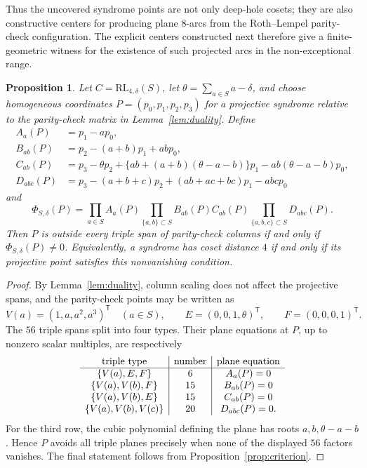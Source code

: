 ﻿\documentclass[11pt]{article}
\newcommand{\RL}{\mathrm{RL}}
\theoremstyle{plain}
\newtheorem{proposition}[theorem]{Proposition}
\theoremstyle{definition}
\begin{document}
Thus the uncovered syndrome points are not only deep-hole cosets; they are
also constructive centers for producing plane \(8\)-arcs from the
Roth--Lempel parity-check configuration.  The explicit centers constructed
next therefore give a finite-geometric witness for the existence of such
projected arcs in the non-exceptional range.

\begin{proposition}
\label{prop:explicit-product}
Let \(C=\RL_{4,\delta}(S)\), let
\(\theta=\sum_{a\in S}a-\delta\), and choose homogeneous coordinates
\(P=(p_0,p_1,p_2,p_3)\) for a projective syndrome relative to the
parity-check matrix in Lemma~\ref{lem:duality}.  Define
\[
\begin{aligned}
A_a(P)&=p_1-ap_0,\\
B_{ab}(P)&=p_2-(a+b)p_1+abp_0,\\
C_{ab}(P)&=p_3-\theta p_2+
 \{ab+(a+b)(\theta-a-b)\}p_1-ab(\theta-a-b)p_0,\\
D_{abc}(P)&=p_3-(a+b+c)p_2+(ab+ac+bc)p_1-abcp_0
\end{aligned}
\]
and
\[
 \Phi_{S,\delta}(P)=
 \prod_{a\in S}A_a(P)
 \prod_{\{a,b\}\subset S}B_{ab}(P)C_{ab}(P)
 \prod_{\{a,b,c\}\subset S}D_{abc}(P).
\]
Then \(P\) is outside every triple span of parity-check columns if and only
if \(\Phi_{S,\delta}(P)\ne0\).  Equivalently, a syndrome has coset distance
\(4\) if and only if its projective point satisfies this nonvanishing
condition.
\end{proposition}

\begin{proof}
By Lemma~\ref{lem:duality}, column scaling does not affect the
projective spans, and the parity-check points may be written as
\[
 V(a)=(1,a,a^2,a^3)^{\mathsf T}\quad(a\in S),\qquad
 E=(0,0,1,\theta)^{\mathsf T},\qquad F=(0,0,0,1)^{\mathsf T}.
\]
The \(56\) triple spans split into four types.  Their plane equations at
\(P\), up to nonzero scalar multiples, are respectively
\[
\begin{array}{c|c|c}
\hbox{triple type}&\hbox{number}&\hbox{plane equation}\\ \hline
\{V(a),E,F\}&6&A_a(P)=0\\
\{V(a),V(b),F\}&15&B_{ab}(P)=0\\
\{V(a),V(b),E\}&15&C_{ab}(P)=0\\
\{V(a),V(b),V(c)\}&20&D_{abc}(P)=0.
\end{array}
\]
For the third row, the cubic polynomial defining the plane has roots
\(a,b,\theta-a-b\).  Hence \(P\) avoids all triple planes precisely when
none of the displayed \(56\) factors vanishes.  The final statement follows
from Proposition~\ref{prop:criterion}.
\end{proof}
\end{document}

